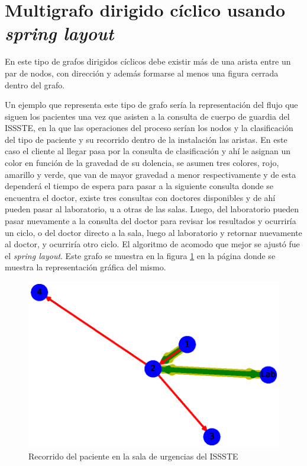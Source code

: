 \documentclass{article}
\begin{document}
\section{Multigrafo dirigido cíclico usando \textit{spring layout}}

En este tipo de grafos dirigidos cíclicos debe existir más de una arista entre un par de nodos, con dirección y además formarse al menos una figura cerrada dentro del grafo. 

Un ejemplo que representa este tipo de grafo sería la representación del flujo que siguen los pacientes una vez que asisten a la consulta de cuerpo de guardia del ISSSTE, en la que las operaciones del proceso serían los nodos y la clasificación del tipo de paciente y su recorrido dentro de la instalación las aristas. En este caso el cliente al llegar pasa por la consulta de clasificación y ahí le asignan un color en función de la gravedad de su dolencia, se asumen tres colores, rojo, amarillo y verde, que van de mayor gravedad a menor respectivamente y de esta dependerá el tiempo de espera para pasar a la siguiente consulta donde se encuentra el doctor, existe tres consultas con doctores disponibles y de ahí pueden pasar al laboratorio, u a otras de las salas. Luego, del laboratorio pueden pasar nuevamente a la consulta del doctor para revisar los resultados y ocurriría un ciclo, o del doctor directo a la sala, luego al laboratorio y retornar nuevamente al doctor, y ocurriría otro ciclo. El algoritmo de acomodo que mejor se ajustó fue el \textit{spring layout}. Este grafo se muestra en la figura \ref{fig:Fig11} en la página \pageref{fig:Fig11} donde se muestra la representación gráfica del mismo. 
\newpage


\begin{figure}[htbp]
    \centering
    \includegraphics[scale=0.6]{imagenes1/Fig11.eps}
    \caption{Recorrido del paciente en la sala de urgencias del ISSSTE}
    \label{fig:Fig11}
\end{figure}
\end{document}
